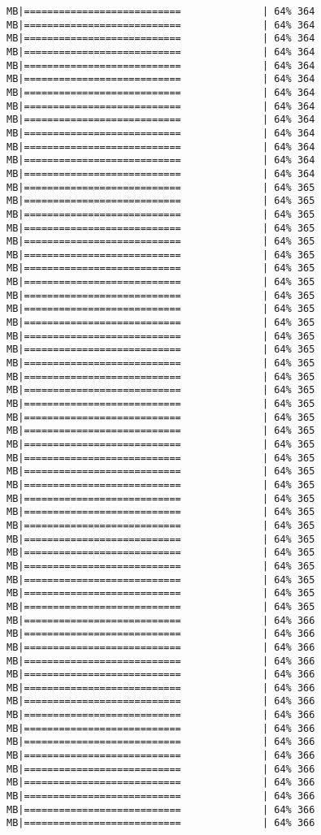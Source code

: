 \documentclass[
]{article}
\begin{document}
\begin{verbatim}
MB|===========================              | 64% 364 MB|===========================              | 64% 364 MB|===========================              | 64% 364 MB|===========================              | 64% 364 MB|===========================              | 64% 364 MB|===========================              | 64% 364 MB|===========================              | 64% 364 MB|===========================              | 64% 364 MB|===========================              | 64% 364 MB|===========================              | 64% 364 MB|===========================              | 64% 364 MB|===========================              | 64% 364 MB|===========================              | 64% 364 MB|===========================              | 64% 365 MB|===========================              | 64% 365 MB|===========================              | 64% 365 MB|===========================              | 64% 365 MB|===========================              | 64% 365 MB|===========================              | 64% 365 MB|===========================              | 64% 365 MB|===========================              | 64% 365 MB|===========================              | 64% 365 MB|===========================              | 64% 365 MB|===========================              | 64% 365 MB|===========================              | 64% 365 MB|===========================              | 64% 365 MB|===========================              | 64% 365 MB|===========================              | 64% 365 MB|===========================              | 64% 365 MB|===========================              | 64% 365 MB|===========================              | 64% 365 MB|===========================              | 64% 365 MB|===========================              | 64% 365 MB|===========================              | 64% 365 MB|===========================              | 64% 365 MB|===========================              | 64% 365 MB|===========================              | 64% 365 MB|===========================              | 64% 365 MB|===========================              | 64% 365 MB|===========================              | 64% 365 MB|===========================              | 64% 365 MB|===========================              | 64% 365 MB|===========================              | 64% 365 MB|===========================              | 64% 365 MB|===========================              | 64% 365 MB|===========================              | 64% 366 MB|===========================              | 64% 366 MB|===========================              | 64% 366 MB|===========================              | 64% 366 MB|===========================              | 64% 366 MB|===========================              | 64% 366 MB|===========================              | 64% 366 MB|===========================              | 64% 366 MB|===========================              | 64% 366 MB|===========================              | 64% 366 MB|===========================              | 64% 366 MB|===========================              | 64% 366 MB|===========================              | 64% 366 MB|===========================              | 64% 366 MB|===========================              | 64% 366 MB|===========================              | 64% 366 
\end{verbatim}
\end{document}
